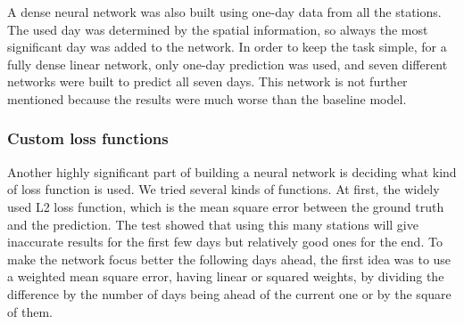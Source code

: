 \documentclass{article}
\begin{document}
A dense neural network was also built using one-day data from all the
stations. The used day was determined by the spatial information, so always
the most significant day was added to the network. In order to keep the task
simple, for a fully dense linear network, only one-day prediction was used,
and seven different networks were built to predict all seven days. This
network is not further mentioned because the results were much worse than the
baseline model.

\subsubsection{Custom loss functions}

Another highly significant part of building a neural network is deciding what
kind of loss function is used. We tried several kinds of functions. At first,
the widely used L2 loss function, which is the mean square error between the
ground truth and the prediction. The test showed that using this many stations
will give inaccurate results for the first few days but relatively good ones
for the end. To make the network focus better the following days ahead, the
first idea was to use a weighted mean square error, having linear or squared
weights, by dividing the difference by the number of days being ahead of the
current one or by the square of them.
\end{document}
